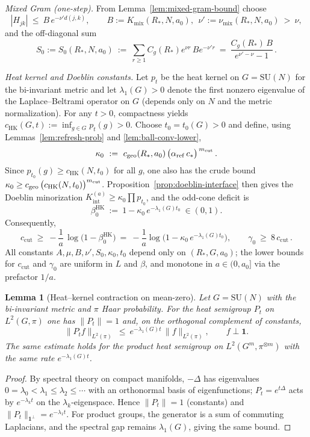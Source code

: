 \documentclass[11pt]{amsart}
\theoremstyle{plain}
\newtheorem{lemma}[theorem]{Lemma}
\theoremstyle{definition}
\theoremstyle{remark}
\begin{document}
\emph{Mixed Gram (one-step).} From Lemma~\ref{lem:mixed-gram-bound} choose
\[
  |H_{jk}|\ \le\ B\,e^{-\nu' d(j,k)},\qquad B:=K_{\mathrm{mix}}(R_*,N,a_0),\ \ \nu':=\nu_{\mathrm{mix}}(R_*,N,a_0)\ >\ \nu,
\]
and the off-diagonal sum
\[
  S_0:=S_0(R_*,N,a_0)\ :=\ \sum_{r\ge 1} C_g(R_*) e^{\nu r}\, B e^{-\nu' r}
   \ =\ \frac{C_g(R_*)\,B}{e^{\nu'-\nu}-1}\,.
\]

\emph{Heat kernel and Doeblin constants.} Let $p_t$ be the heat kernel on $G=\mathrm{SU}(N)$ for the bi-invariant metric and let $\lambda_1(G)>0$ denote the first nonzero eigenvalue of the Laplace--Beltrami operator on $G$ (depends only on $N$ and the metric normalization). For any $t>0$, compactness yields $c_{\mathrm{HK}}(G,t):=\inf_{g\in G} p_t(g)>0$. Choose $t_0=t_0(G)>0$ and define, using Lemmas~\ref{lem:refresh-prob} and \ref{lem:ball-conv-lower},
\[
  \kappa_0\ :=\ c_{\mathrm{geo}}(R_*,a_0)\,\bigl(\alpha_{\mathrm{ref}}\,c_*\bigr)^{\,m_{\rm cut}}\,.
\]
Since $p_{t_0}(g)\ge c_{\mathrm{HK}}(N,t_0)$ for all $g$, one also has the crude bound $\kappa_0\ge c_{\mathrm{geo}}\,\bigl(c_{\mathrm{HK}}(N,t_0)\bigr)^{m_{\rm cut}}$. Proposition~\ref{prop:doeblin-interface} then gives the Doeblin minorization $K_{\mathrm{int}}^{(a)}\ge \kappa_0 \prod p_{t_0}$, and the odd-cone deficit is
\[
  \beta_0^{\mathrm{HK}}\ :=\ 1-\kappa_0\,e^{-\lambda_1(G) t_0}\ \in (0,1).
\]
Consequently,
\[
  c_{\mathrm{cut}}\ \ge\ -\frac{1}{a}\,\log\bigl(1-\beta_0^{\mathrm{HK}}\bigr)
   \ =\ -\frac{1}{a}\log\bigl(1-\kappa_0\,e^{-\lambda_1(G) t_0}\bigr),
  \qquad \gamma_0\ \ge\ 8\,c_{\mathrm{cut}}\,.
\]
All constants $A,\mu,B,\nu',S_0,\kappa_0,t_0$ depend only on $(R_*,G,a_0)$; the lower bounds for $c_{\mathrm{cut}}$ and $\gamma_0$ are uniform in $L$ and $\beta$, and monotone in $a\in(0,a_0]$ via the prefactor $1/a$.

\begin{lemma}[Heat--kernel contraction on mean-zero]\label{lem:hk-contraction}
Let $G=\mathrm{SU}(N)$ with the bi-invariant metric and $\pi$ Haar probability. For the heat semigroup $P_t$ on $L^2(G,\pi)$ one has $\|P_t\|=1$ and, on the orthogonal complement of constants,
\[
  \|P_t f\|_{L^2(\pi)}\ \le\ e^{-\lambda_1(G) t}\,\|f\|_{L^2(\pi)},\qquad f\perp \mathbf 1.
\]
The same estimate holds for the product heat semigroup on $L^2(G^m,\pi^{\otimes m})$ with the same rate $e^{-\lambda_1(G) t}$.
\end{lemma}

\begin{proof}
By spectral theory on compact manifolds, $-\Delta$ has eigenvalues $0=\lambda_0<\lambda_1\le\lambda_2\le\cdots$ with an orthonormal basis of eigenfunctions; $P_t=e^{t\Delta}$ acts by $e^{-\lambda_k t}$ on the $\lambda_k$-eigenspace. Hence $\|P_t\|=1$ (constants) and $\|P_t\|_{\mathbf 1^\perp}=e^{-\lambda_1 t}$. For product groups, the generator is a sum of commuting Laplacians, and the spectral gap remains $\lambda_1(G)$, giving the same bound.
\end{proof}
\end{document}
